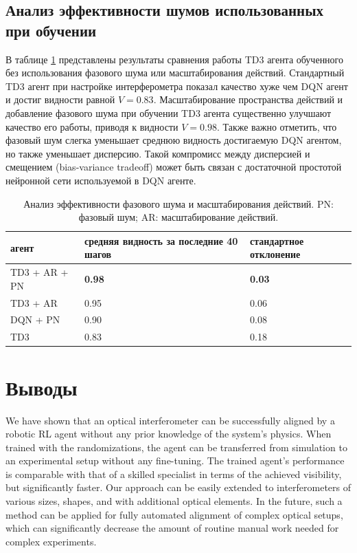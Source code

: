 \subsection{Анализ эффективности шумов использованных при обучении}

В таблице \ref{tab:abl_td3} представлены результаты сравнения работы TD3 агента обученного без использования фазового шума или масштабирования действий. Стандартный TD3 агент при настройке интерферометра показал качество хуже чем DQN агент и достиг видности равной $V = 0.83$. Масштабирование пространства действий и добавление фазового шума при обучении TD3 агента существенно улучшают качество его работы, приводя к видности $V = 0.98$. Также важно отметить, что фазовый шум слегка уменьшает среднюю видность достигаемую DQN агентом, но также уменьшает дисперсию. Такой компромисс между дисперсией и смещением (bias-variance tradeoff) может быть связан с достаточной простотой нейронной сети используемой в DQN агенте. 

\begin{table} [htbp]
    \centering
    \begin{threeparttable}
        \caption{Анализ эффективности фазового шума и масштабирования действий. PN: фазовый шум; AR: масштабирование действий.}\label{tab:abl_td3}
        \begin{tabular}{| p{4cm} || p{6cm} || p{6cm} |}
            \hline
            \hline
            агент & средняя видность за последние 40 шагов & стандартное отклонение \\
            \hline
            TD3 + AR + PN & \textbf{0.98} & \textbf{0.03} \\
            TD3 + AR & 0.95 & 0.06\\
            DQN + PN & 0.90 & 0.08\\
            TD3& 0.83 & 0.18\\
            \hline
            \hline
        \end{tabular}
    \end{threeparttable}
\end{table}

\section{Выводы}

We have shown that an optical interferometer can be successfully aligned by a robotic RL agent
without any prior knowledge of the system’s physics. When trained with the randomizations, the
agent can be transferred from simulation to an experimental setup without any fine-tuning. The
trained agent’s performance is comparable with that of a skilled specialist in terms of the achieved
visibility, but significantly faster. Our approach can be easily extended to interferometers of various
sizes, shapes, and with additional optical elements. In the future, such a method can be applied for
fully automated alignment of complex optical setups, which can significantly decrease the amount of
routine manual work needed for complex experiments.

